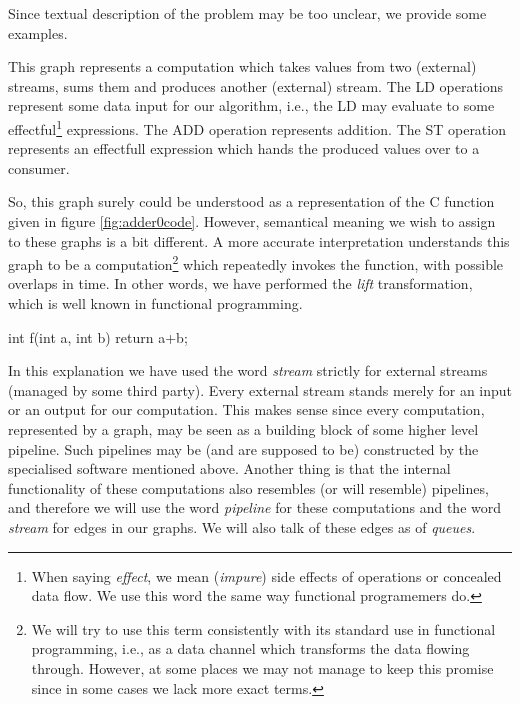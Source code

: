 Since textual description of the problem may be too unclear, we provide some examples.


This graph represents a computation which takes values from two (external) streams, sums them and produces another (external) stream. The LD operations represent some data input for our algorithm, i.e., the LD may evaluate to some effectful\footnote{When saying \emph{effect}, we mean (\emph{impure}) side effects of operations or concealed data flow. We use this word the same way functional programemers do.} expressions. The ADD operation represents addition. The ST operation represents an effectfull expression which hands the produced values over to a consumer. 


So, this graph surely could be understood as a representation of the C function given in figure \ref{fig:adder0code}. However, semantical meaning we wish to assign to these graphs is a bit different. A more accurate interpretation understands this graph to be a computation\footnote{We will try to use this term consistently with its standard use in functional programming, i.e., as a data channel which transforms the data flowing through. However, at some places we may not manage to keep this promise since in some cases we lack more exact terms.} which repeatedly invokes the function, with possible overlaps in time. In other words, we have performed the \emph{lift} transformation, which is well known in functional programming.

\mybeginfig
\begin{code}
int f(int a, int b)
{
  return a+b;
}
\end{code}

In this explanation we have used the word \emph{stream} strictly for external streams (managed by some third party). Every external stream stands merely for an input or an output for our computation. This makes sense since every computation, represented by a graph, may be seen as a building block of some higher level pipeline. Such pipelines may be (and are supposed to be) constructed by the specialised software mentioned above. Another thing is that the internal functionality of these computations also resembles (or will resemble) pipelines, and therefore we will use the word \emph{pipeline} for these computations and the word \emph{stream} for edges in our graphs. We will also talk of these edges as of \emph{queues}. 


